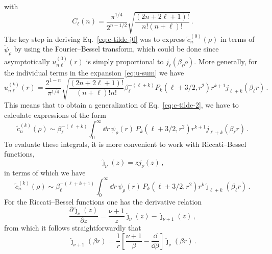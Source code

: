   with
  \begin{equation}
   C_\ell(n) = \frac{\pi^{1/4}}{2^{n-1/2}}\sqrt{\frac{(2n+2\ell+1)!}
   {n!(n+\ell)!}} \,.
  \label{eq:C}
  \end{equation}
  The key step in deriving Eq.~\eqref{eq:c-tilde-j0} was to express
  $\tilde{c}_n^{(0)}(\rho)$ in terms of $\tilde{\psi}_\rho$ by using the
  Fourier--Bessel transform, which could be done since asymptotically
  $u_{n\ell}^{(0)}(r)$ is simply proportional to $j_\ell(\beta_\ell\rho)$.
  More generally, for the individual terms in the expansion~\eqref{eq:u-sum}
  we have
  \begin{equation}
   u_{n\ell}^{(k)}(r) = \frac{2^{1-n}}{\pi^{1/4}}
   \sqrt{\frac{(2n+2\ell+1)!}{(n+\ell)!n!}} \beta_\ell^{-(\ell+k)}
   P_k(\ell+3/2,r^2) r^{k+1} j_{\ell+k}(\beta_\ell r) \,.
 \end{equation}
  This means that to obtain a generalization of Eq.~\eqref{eq:c-tilde-2},
  we have to calculate expressions of the form
  \begin{equation}
   \tilde{c}_n^{(k)}(\rho) \sim \beta_\ell^{-(\ell+k)}
   \int_0^\infty\dd r\,\psi_\rho(r)\,  P_k(\ell+3/2,r^2)
   r^{k+1} j_{\ell+k}(\beta_\ell r) \,.
  \label{eq:c-tilde-k-1}
\end{equation}
  To evaluate these integrals, it is more convenient to work with
  Riccati--Bessel functions,
  \begin{equation}
   \hat\jmath_\nu(z) = zj_\nu(z) \,,
  \label{eq:j-hat-j}
  \end{equation}
  in terms of which we have
  \begin{equation}
   \tilde{c}_n^{(k)}(\rho) \sim \beta_\ell^{-(\ell+k+1)}
   \int_0^\infty\dd r\,\psi_\rho(r)\,  P_k(\ell+3/2,r^2)
   r^k \hat\jmath_{\ell+k}(\beta_\ell r) \,.
   \label{eq:c-tilde-k-1a}
  \end{equation}
  For the Riccati--Bessel functions one has the derivative
  relation~\cite{abramowitz1964}
  \begin{equation}
   \frac{\partial \hat\jmath_\nu(z)}{\partial z}
   = \frac{\nu+1}{z} \hat\jmath_\nu(z) - \hat\jmath_{\nu+1}(z) \,,
  \label{eq:j-hat-derivative}
  \end{equation}
  from which it follows straightforwardly that
  \begin{equation}
   \hat\jmath_{\nu+1}(\beta r) = \frac{1}{r}
   \left[\frac{\nu+1}\beta-\frac\dd{\dd\beta}\right]\hat\jmath_\nu(\beta r) \,.
  \label{eq:j-hat-beta}
  \end{equation}


